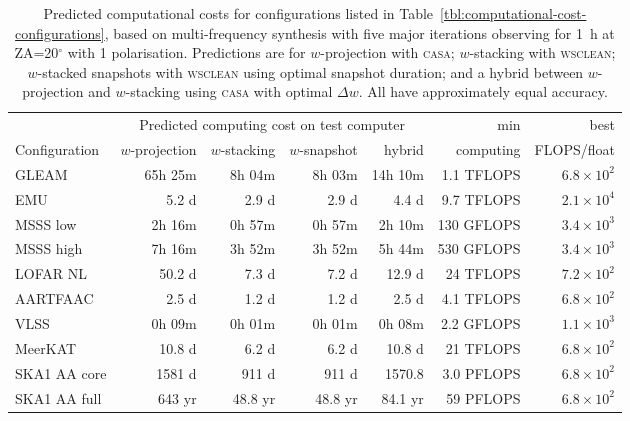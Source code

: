 \documentclass[useAMS,usenatbib]{mn2e}
\newcommand{\degree}{\ensuremath{^{\circ}}\xspace}
\begin{document}
\begin{table}
\caption{Predicted computational costs for configurations listed in Table~\ref{tbl:computational-cost-configurations}, based on multi-frequency synthesis with five major iterations observing for 1~h at ZA=20\degree with 1 polarisation. Predictions are for $w$-projection with \textsc{casa}; $w$-stacking with \textsc{wsclean}; $w$-stacked snapshots with \textsc{wsclean} using optimal snapshot duration; and a hybrid between $w$-projection and $w$-stacking using \textsc{casa} with optimal $\Delta w$. All have approximately equal accuracy.} \label{tbl:computational-cost-predictions}
\begin{tabular}{l|rrrr|rr}
               & \multicolumn{4}{c|}{Predicted computing cost on test computer} & min & best \\
 Configuration & $w$-projection & $w$-stacking & $w$-snapshot & hybrid & computing & FLOPS/float \\
 \hline
 GLEAM    &  65h 25m & 8h 04m &  8h 03m & 14h 10m   & 1.1 TFLOPS & $6.8 \times 10^2$    \\
 EMU      &    5.2 d &  2.9 d &   2.9 d & 4.4 d     & 9.7 TFLOPS & $2.1 \times 10^4$      \\
 MSSS low &  2h 16m  & 0h 57m &  0h 57m & 2h 10m    & 130 GFLOPS & $3.4 \times 10^3$   \\
 MSSS high&  7h 16m  & 3h 52m &  3h 52m & 5h 44m    & 530 GFLOPS & $3.4 \times 10^3$   \\
 LOFAR NL &  50.2 d  &  7.3 d &   7.2 d & 12.9 d    &  24 TFLOPS & $7.2 \times 10^2$ \\
 AARTFAAC &  2.5 d   &  1.2 d &   1.2 d &   2.5 d   & 4.1 TFLOPS & $6.8 \times 10^2$   \\
 VLSS     &  0h 09m  & 0h 01m &  0h 01m &  0h 08m   & 2.2 GFLOPS & $1.1 \times 10^3$     \\
 MeerKAT  &   10.8 d &  6.2 d &   6.2 d &  10.8 d   &  21 TFLOPS & $6.8 \times 10^2$ \\
 SKA1 AA core&1581 d &  911 d &   911 d &  1570.8   & 3.0 PFLOPS & $6.8 \times 10^2$ \\
 SKA1 AA full& 643 yr& 48.8 yr & 48.8 yr& 84.1 yr   &  59 PFLOPS & $6.8 \times 10^2$ \\
\end{tabular}
\end{table}
\end{document}
